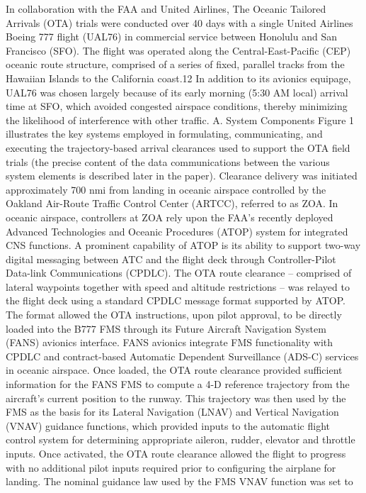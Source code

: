 \documentclass{aer1315-pretty}
\begin{document}
\begin{itemize}
     In collaboration with the FAA and United Airlines, The Oceanic Tailored Arrivals (OTA) trials were conducted
over 40 days with a single United Airlines Boeing 777 flight (UAL76) in commercial service between Honolulu and
San Francisco (SFO). The flight was operated along the Central-East-Pacific (CEP) oceanic route structure,
comprised of a series of fixed, parallel tracks from the Hawaiian Islands to the California coast.12 In addition to its
avionics equipage, UAL76 was chosen largely because of its early morning (5:30 AM local) arrival time at SFO,
which avoided congested airspace conditions, thereby minimizing the likelihood of interference with other traffic.
A. System Components
     Figure 1 illustrates the key systems employed in formulating, communicating, and executing the trajectory-based
arrival clearances used to support the OTA field trials (the precise content of the data communications between the
various system elements is described later in the paper). Clearance delivery was initiated approximately 700 nmi
from landing in oceanic airspace controlled by the Oakland Air-Route Traffic Control Center (ARTCC), referred to
as ZOA. In oceanic airspace, controllers at ZOA rely upon the FAA’s recently deployed Advanced Technologies
and Oceanic Procedures (ATOP) system for integrated CNS functions. A prominent capability of ATOP is its ability
to support two-way digital messaging between ATC and the flight deck through Controller-Pilot Data-link
Communications (CPDLC). The OTA route clearance – comprised of lateral waypoints together with speed and
altitude restrictions – was relayed to the flight deck using a standard CPDLC message format supported by ATOP.
The format allowed the OTA instructions, upon pilot approval, to be directly loaded into the B777 FMS through its
Future Aircraft Navigation System (FANS) avionics interface. FANS avionics integrate FMS functionality with
CPDLC and contract-based Automatic Dependent Surveillance (ADS-C) services in oceanic airspace.
    Once loaded, the OTA route clearance provided sufficient information for the FANS FMS to compute a 4-D
reference trajectory from the aircraft’s current position to the runway. This trajectory was then used by the FMS as
the basis for its Lateral Navigation (LNAV) and Vertical Navigation (VNAV) guidance functions, which provided
inputs to the automatic flight control system for determining appropriate aileron, rudder, elevator and throttle inputs.
Once activated, the OTA route clearance allowed the flight to progress with no additional pilot inputs required prior
to configuring the airplane for landing. The nominal guidance law used by the FMS VNAV function was set to

\end{itemize}
\end{document}
